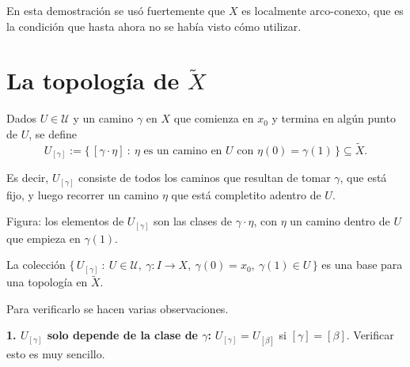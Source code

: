 \documentclass[11pt]{article}
\begin{document}
En esta demostración se usó fuertemente que $X$ es localmente arco-conexo, que es la condición que hasta ahora no se había visto cómo utilizar.

\section*{La topología de $\tilde X$}

\begin{defn}\label{def:Ugamma}
Dados $U\in\mathcal U$ y un camino $\gamma$ en $X$ que comienza en $x_0$ y termina en algún punto de $U$, se define
\[
  U_{[\gamma]}:=\{\,[\gamma\cdot\eta]\ :\ \eta\text{ es un camino en }U\text{ con }\eta(0)=\gamma(1)\,\}\subseteq\tilde X .
\]
\end{defn}

Es decir, $U_{[\gamma]}$ consiste de todos los caminos que resultan de tomar $\gamma$, que está fijo, y luego recorrer un camino $\eta$ que está completito adentro de $U$.

\begin{center}
\end{center}

\noindent Figura: los elementos de $U_{[\gamma]}$ son las clases de $\gamma\cdot\eta$, con $\eta$ un camino dentro de $U$ que empieza en $\gamma(1)$.

\begin{lema}\label{lema:base-Xtilde}
La colección $\{\,U_{[\gamma]}\ :\ U\in\mathcal U,\ \gamma\colon I\to X,\ \gamma(0)=x_0,\ \gamma(1)\in U\,\}$ es una base para una topología en $\tilde X$.
\end{lema}

Para verificarlo se hacen varias observaciones.

\medskip\noindent\textbf{1. $U_{[\gamma]}$ solo depende de la clase de $\gamma$:} $U_{[\gamma]}=U_{[\beta]}$ si $[\gamma]=[\beta]$. Verificar esto es muy sencillo.
\end{document}

